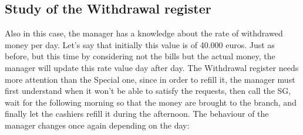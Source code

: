 \documentclass{article}
\begin{document}
\subsection{Study of the Withdrawal register}
Also in this case, the manager has a knowledge about the rate of withdrawed money per day. Let's say that initially this value is of 40.000 euros. Just as before, but this time by considering not the bills but the actual money, the manager will update this rate value day after day.
\newline The Withdrawal register needs more attention than the Special one, since in order to refill it, the manager must first understand when it won't be able to satisfy the requests, then call the SG, wait for the following morning so that the money are brought to the branch, and finally let the cashiers refill it during the afternoon. The behaviour of the manager changes once again depending on the day:
\end{document}
